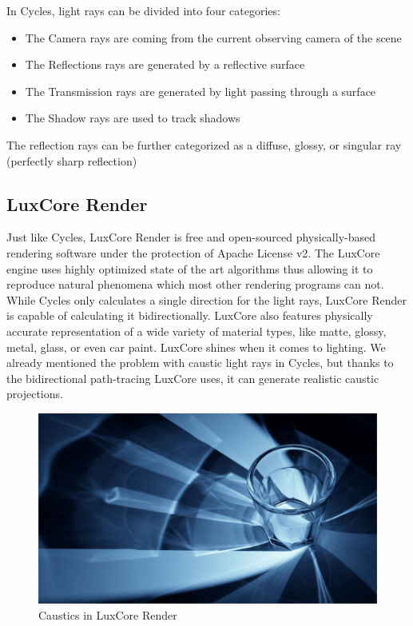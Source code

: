 \documentclass[conference]{IEEEtran}
\begin{document}
In Cycles, light rays can be divided into four categories:
\begin{itemize}
\item The Camera rays are coming from the current observing camera of the scene
\item The Reflections rays are generated by a reflective surface
\item The Transmission rays are generated by light passing through a surface
\item The Shadow rays are used to track shadows\\ %
\end{itemize}
The reflection rays can be further categorized as a diffuse, glossy, or singular ray (perfectly sharp reflection)

\subsection{LuxCore Render}\label{luxCore}

Just like Cycles, LuxCore Render is free and open-sourced physically-based rendering software under the protection of Apache License v2. The LuxCore engine uses highly optimized state of the art algorithms thus allowing it to reproduce natural phenomena which most other rendering programs can not. While Cycles only calculates a single direction for the light rays, LuxCore Render is capable of calculating it bidirectionally. LuxCore also features physically accurate representation of a wide variety of material types, like matte, glossy, metal, glass, or even car paint. LuxCore shines when it comes to lighting. We already mentioned the problem with caustic light rays in Cycles, but thanks to the bidirectional path-tracing LuxCore uses, it can generate realistic caustic projections.

\begin{figure}[htbp]
\centerline{\includegraphics[scale=0.17]{Images/lux_caustic.jpg}}
\caption{Caustics in LuxCore Render}
\label{luxCaustics}
\end{figure}
\end{document}
